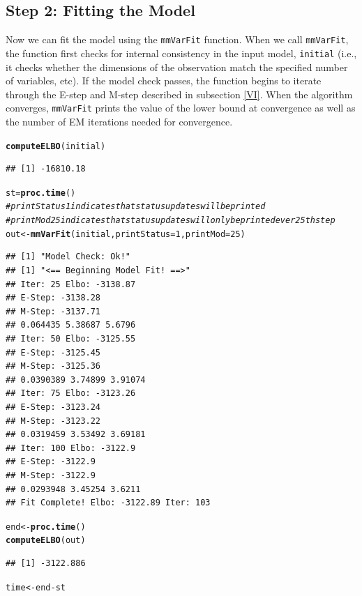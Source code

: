 \documentclass{article}\usepackage[]{graphicx}\usepackage[]{color}
\makeatletter
\newcommand{\hlnum}[1]{\textcolor[rgb]{0.686,0.059,0.569}{#1}}%
\newcommand{\hlcom}[1]{\textcolor[rgb]{0.678,0.584,0.686}{\textit{#1}}}%
\newcommand{\hlopt}[1]{\textcolor[rgb]{0,0,0}{#1}}%
\newcommand{\hlstd}[1]{\textcolor[rgb]{0.345,0.345,0.345}{#1}}%
\newcommand{\hlkwb}[1]{\textcolor[rgb]{0.69,0.353,0.396}{#1}}%
\newcommand{\hlkwc}[1]{\textcolor[rgb]{0.333,0.667,0.333}{#1}}%
\newcommand{\hlkwd}[1]{\textcolor[rgb]{0.737,0.353,0.396}{\textbf{#1}}}%
\newenvironment{kframe}{%
 \def\at@end@of@kframe{}%
 \ifinner\ifhmode%
  \def\at@end@of@kframe{\end{minipage}}%
  \begin{minipage}{\columnwidth}%
 \fi\fi%
 \def\FrameCommand##1{\hskip\@totalleftmargin \hskip-\fboxsep
 \colorbox{shadecolor}{##1}\hskip-\fboxsep
     \hskip-\linewidth \hskip-\@totalleftmargin \hskip\columnwidth}%
 \MakeFramed {\advance\hsize-\width
   \@totalleftmargin\z@ \linewidth\hsize
   \@setminipage}}%
 {\par\unskip\endMakeFramed%
 \at@end@of@kframe}
\newenvironment{knitrout}{}{} %
\renewenvironment{knitrout}{\begin{singlespace}}{\end{singlespace}}
\makeatother
\begin{document}
\subsection{Step 2: Fitting the Model}
Now we can fit the model using the \texttt{mmVarFit} function. When we call \texttt{mmVarFit}, the function first checks for internal consistency in the input model, \texttt{initial} (i.e., it checks whether the dimensions of the observation match the specified number of variables, etc). If the model check passes, the function begins to iterate through the E-step and M-step described in subsection \ref{VI}. When the algorithm converges, \texttt{mmVarFit} prints the value of the lower bound at convergence as well as the number of EM iterations needed for convergence.

\begin{knitrout}
\color{fgcolor}\begin{kframe}
\begin{alltt}
\hlkwd{computeELBO}\hlstd{(initial)}
\end{alltt}
\begin{verbatim}
## [1] -16810.18
\end{verbatim}
\begin{alltt}
\hlstd{st} \hlkwb{=} \hlkwd{proc.time}\hlstd{()}
\hlcom{#printStatus 1 indicates that status updates will be printed}
\hlcom{# printMod 25 indicates that status updates will only be printed ever 25th step}
\hlstd{out} \hlkwb{<-} \hlkwd{mmVarFit}\hlstd{(initial,} \hlkwc{printStatus} \hlstd{=} \hlnum{1}\hlstd{,} \hlkwc{printMod} \hlstd{=} \hlnum{25}\hlstd{)}
\end{alltt}
\begin{verbatim}
## [1] "Model Check: Ok!"
## [1] "<== Beginning Model Fit! ==>"
## Iter: 25 Elbo: -3138.87
## E-Step: -3138.28
## M-Step: -3137.71
## 0.064435 5.38687 5.6796 
## Iter: 50 Elbo: -3125.55
## E-Step: -3125.45
## M-Step: -3125.36
## 0.0390389 3.74899 3.91074 
## Iter: 75 Elbo: -3123.26
## E-Step: -3123.24
## M-Step: -3123.22
## 0.0319459 3.53492 3.69181 
## Iter: 100 Elbo: -3122.9
## E-Step: -3122.9
## M-Step: -3122.9
## 0.0293948 3.45254 3.6211 
## Fit Complete! Elbo: -3122.89 Iter: 103
\end{verbatim}
\begin{alltt}
\hlstd{end} \hlkwb{<-} \hlkwd{proc.time}\hlstd{()}
\hlkwd{computeELBO}\hlstd{(out)}
\end{alltt}
\begin{verbatim}
## [1] -3122.886
\end{verbatim}
\begin{alltt}
\hlstd{time} \hlkwb{<-} \hlstd{end} \hlopt{-} \hlstd{st}
\end{alltt}
\end{kframe}
\end{knitrout}
\end{document}
